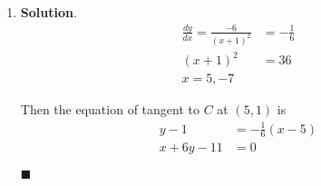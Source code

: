 \documentclass[12pt]{article}
\newenvironment*{sol}{\par \textbf{Solution}.}{\hfill$\blacksquare$}
\begin{document}
\begin{enumerate}
\begin{enumerate}
\begin{sol}
\begin{align*}
                    x&=n\pi+\pi/4
                \end{align*}
                where $n\in \mathbb{Z}$ is integer.
            \end{sol}
        \end{enumerate}
        \item \begin{sol}
            \begin{align*}
                \frac{dy}{dx}=\frac{-6}{(x+1)^2}&=-\frac{1}{6}\\
                (x+1)^2&=36\\
                x=5,-7
            \end{align*}

            Then the equation of tangent to $C$ at $(5,1)$ is \begin{align*}
                y-1&=-\frac{1}{6}(x-5)\\
                x+6y-11&=0
            \end{align*}


\end{sol}
\end{enumerate}
\end{document}
